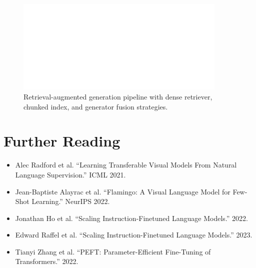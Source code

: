 \documentclass{article}
\begin{document}
\begin{figure}[H]
  \centering
  \includegraphics[width=0.9\textwidth]{rag_pipeline.png}
  \caption{Retrieval-augmented generation pipeline with dense retriever, chunked index, and generator fusion strategies.}
  \label{fig:rag_pipeline}
\end{figure}
\FloatBarrier

\section*{Further Reading}
\begin{itemize}
  \item Alec Radford et al. ``Learning Transferable Visual Models From Natural Language Supervision.'' ICML 2021.
  \item Jean-Baptiste Alayrac et al. ``Flamingo: A Visual Language Model for Few-Shot Learning.'' NeurIPS 2022.
  \item Jonathan Ho et al. ``Scaling Instruction-Finetuned Language Models.'' 2022.
  \item Edward Raffel et al. ``Scaling Instruction-Finetuned Language Models.'' 2023.
  \item Tianyi Zhang et al. ``PEFT: Parameter-Efficient Fine-Tuning of Transformers.'' 2022.
\end{itemize}
\end{document}
